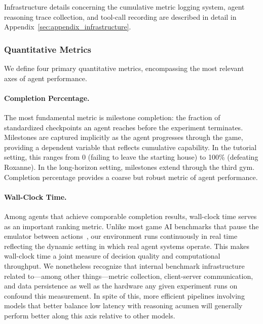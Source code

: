 Infrastructure details concerning the cumulative metric logging system, agent reasoning trace collection, and tool-call recording are described in detail in Appendix~\ref{sec:appendix_infrastructure}.

\subsubsection{Quantitative Metrics}\label{sec:quantitative_metrics}

We define four primary quantitative metrics, encompassing the most relevant axes of agent performance.

\paragraph{Completion Percentage.} The most fundamental metric is milestone completion: the fraction of standardized checkpoints an agent reaches before the experiment terminates. Milestones are captured implicitly as the agent progresses through the game, providing a dependent variable that reflects cumulative capability. In the tutorial setting, this ranges from 0 (failing to leave the starting house) to 100\% (defeating Roxanne). In the long-horizon setting, milestones extend through the third gym. Completion percentage provides a coarse but robust metric of agent performance.

\paragraph{Wall-Clock Time.} Among agents that achieve comporable completion results, wall-clock time serves as an important ranking metric. Unlike most game AI benchmarks that pause the emulator between actions~\citep{bellemare2013arcade}, our environment runs continuously in real time reflecting the dynamic setting in which real agent systems operate. This makes wall-clock time a joint measure of decision quality and computational throughput. We nonetheless recognize that internal benchmark infrastructure related to---among other things---metric collection, client-server communication, and data persistence as well as the hardware any given experiment runs on confound this measurement. In spite of this, more efficient pipelines involving models that better balance low latency with reasoning acumen will generally perform better along this axis relative to other models.

